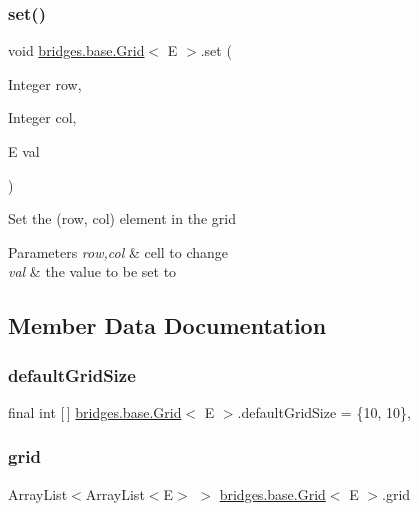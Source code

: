 \subsubsection{\texorpdfstring{set()}{set()}}
{\footnotesize\ttfamily void \hyperlink{classbridges_1_1base_1_1_grid}{bridges.\+base.\+Grid}$<$ E $>$.set (\begin{DoxyParamCaption}\item[{Integer}]{row,  }\item[{Integer}]{col,  }\item[{E}]{val }\end{DoxyParamCaption})}

Set the (row, col) element in the grid 
\begin{DoxyParams}{Parameters}
{\em row,col} & cell to change \\
\hline
{\em val} & the value to be set to \\
\hline
\end{DoxyParams}


\subsection{Member Data Documentation}
\mbox{\label{classbridges_1_1base_1_1_grid_a45c2786d2af83624202192857a27724f}} 
\subsubsection{\texorpdfstring{default\+Grid\+Size}{defaultGridSize}}
{\footnotesize\ttfamily final int \mbox{[}$\,$\mbox{]} \hyperlink{classbridges_1_1base_1_1_grid}{bridges.\+base.\+Grid}$<$ E $>$.default\+Grid\+Size = \{10, 10\}\hspace{0.3cm}{\ttfamily [static]}, {\ttfamily [protected]}}

\mbox{\label{classbridges_1_1base_1_1_grid_ad1f3f6968d58188425bd992c05c655a6}} 
\subsubsection{\texorpdfstring{grid}{grid}}
{\footnotesize\ttfamily Array\+List$<$Array\+List$<$E$>$ $>$ \hyperlink{classbridges_1_1base_1_1_grid}{bridges.\+base.\+Grid}$<$ E $>$.grid\hspace{0.3cm}{\ttfamily [protected]}}

